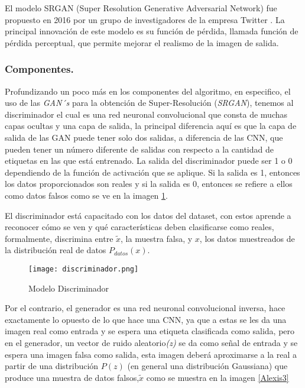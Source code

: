 El modelo SRGAN (Super Resolution Generative Adversarial Network) fue
propuesto en 2016 por un grupo de investigadores de la empresa Twitter \cite{SRGAN}.
La principal innovación de este modelo es su función de pérdida, llamada
función de pérdida perceptual, que permite mejorar el realismo de la imagen de
salida.

\subsubsection{Componentes.}

Profundizando un poco más en los componentes del algoritmo, en especifico, el uso de las \emph{GAN´s} para la obtención de Super-Resolución (\emph{SRGAN}), 
tenemos al discriminador el cual es una red neuronal convolucional que consta de muchas 
capas ocultas y una capa de salida, la principal diferencia aquí es que la capa de salida de las GAN puede tener solo dos salidas, 
a diferencia de las CNN, que pueden tener un número diferente de salidas con respecto a la cantidad de etiquetas en las que está entrenado.
La salida del discriminador puede ser 1 o 0 dependiendo de la función de activación que se aplique. Si la salida es 1, 
entonces los datos proporcionados son reales y si la salida es 0, entonces se refiere a ellos como datos falsos como se ve en la imagen \ref{Alexis2}.

El discriminador está capacitado con los datos del dataset, con estos aprende a reconocer cómo se ven y qué características deben 
clasificarse como reales, formalmente, discrimina entre $\tilde{x}$, la muestra falsa, y $x$, 
los datos muestreados de la distribución real de datos $P_{datos}(x)$.




\begin{figure}[H]
    \begin{center}
      \texttt{[image: discriminador.png]}
      \caption{Modelo Discriminador}
      \label{Alexis2}
    \end{center}
\end{figure}


Por el contrario, el generador es una red neuronal convolucional inversa, hace exactamente lo opuesto de lo que hace una CNN, ya que 
a estas se les da una imagen real como entrada y se espera una etiqueta clasificada como salida, 
pero en el generador, un vector de ruido aleatorio\emph{(z)} se da como señal de entrada 
y se espera una imagen falsa como salida, esta imagen deberá aproximarse a la real a
partir de una distribución $P(z)$ (en general una distribución Gaussiana) que
produce una muestra de datos falsos,$\tilde{x}$ como se muestra en la imagen \ref{Alexis3}

